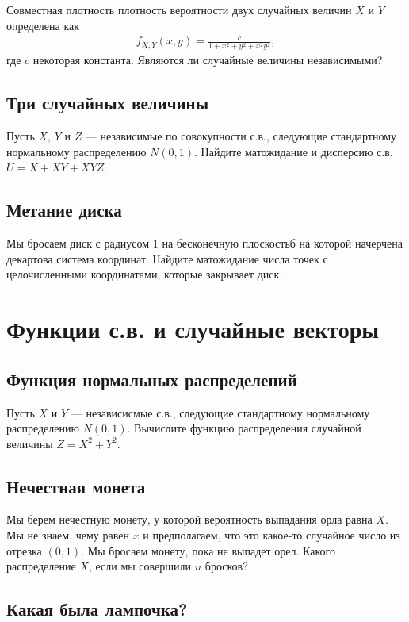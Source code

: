 \documentclass[12pt]{article}
\begin{document}
Совместная плотность плотность вероятности двух случайных величин $X$ и $Y$ определена как
\begin{align*}
    f_{X, Y}(x, y) = \frac{c}{1 + x^2 + y^2 + x^2y^2},
\end{align*}
где $c$ некоторая константа. Являются ли случайные величины независимыми?

\subsection{Три случайных величины}

Пусть $X$, $Y$ и $Z$ --- независимые по совокупности с.в., следующие стандартному нормальному распределению $N(0, 1)$. Найдите матожидание и дисперсию с.в. $U = X + XY + XYZ$. 

\subsection{Метание диска}

Мы бросаем диск с радиусом 1 на бесконечную плоскостьб на которой начерчена декартова система координат. Найдите матожидание числа точек с целочисленными координатами, которые закрывает диск.

\section{Функции с.в. и случайные векторы}

\subsection{Функция нормальных распределений}

Пусть $X$ и $Y$ --- независисмые с.в., следующие стандартному нормальному распределению $N(0, 1)$. Вычислите функцию распределения случайной величины $Z = X^2 + Y^2$.

\subsection{Нечестная монета}

Мы берем нечестную монету, у которой вероятность выпадания орла равна $X$. Мы не знаем, чему равен $x$ и предполагаем, что это какое-то случайное число из отрезка $(0, 1)$. Мы бросаем монету, пока не выпадет орел. Какого распределение $X$, если мы совершили $n$ бросков?

\subsection{Какая была лампочка?}
\end{document}
